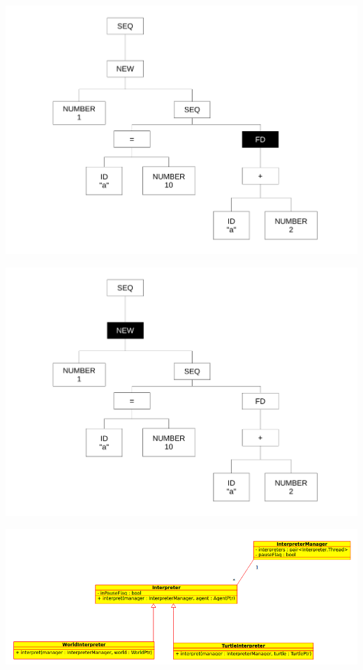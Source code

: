 \begin{frame}
\includegraphics[scale=0.3]{doc/Presentation/img/arbre8.pdf}
\end{frame}

\begin{frame}
\includegraphics[scale=0.3]{doc/Presentation/img/arbre2.pdf}
\end{frame}

\begin{frame}
\includegraphics[scale=0.3]{doc/report/uml/interpreterUML.png}
\end{frame}


